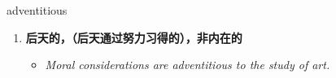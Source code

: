 
\begin{frame}
{\huge adventitious}
\begin{center}
\begin{enumerate}\Large
  \item \textbf{后天的，（后天通过努力习得的），非内在的}
  \begin{itemize}
    \item \em{\Large{Moral considerations are adventitious to the study of art.}}
  \end{itemize}
\end{enumerate}
\end{center}
\end{frame}
